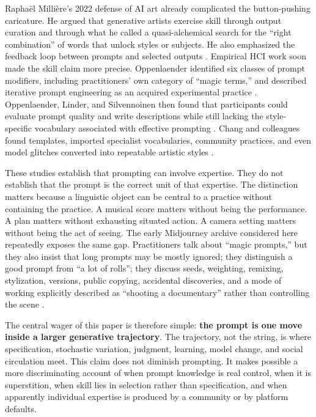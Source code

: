 \documentclass[11pt]{article}
\begin{document}
Raphaël Millière's 2022 defense of AI art already complicated the button-pushing caricature. He argued that generative artists exercise skill through output curation and through what he called a quasi-alchemical search for the ``right combination'' of words that unlock styles or subjects. He also emphasized the feedback loop between prompts and selected outputs \parencite{milliere2022curation}. Empirical HCI work soon made the skill claim more precise. Oppenlaender identified six classes of prompt modifiers, including practitioners' own category of ``magic terms,'' and described iterative prompt engineering as an acquired experimental practice \parencite{oppenlaender2022taxonomy}. Oppenlaender, Linder, and Silvennoinen then found that participants could evaluate prompt quality and write descriptions while still lacking the style-specific vocabulary associated with effective prompting \parencite{oppenlaender2023prompting}. Chang and colleagues found templates, imported specialist vocabularies, community practices, and even model glitches converted into repeatable artistic styles \parencite{chang2023prompt}.

These studies establish that prompting can involve expertise. They do not establish that the prompt is the correct unit of that expertise. The distinction matters because a linguistic object can be central to a practice without containing the practice. A musical score matters without being the performance. A plan matters without exhausting situated action. A camera setting matters without being the act of seeing. The early Midjourney archive considered here repeatedly exposes the same gap. Practitioners talk about ``magic prompts,'' but they also insist that long prompts may be mostly ignored; they distinguish a good prompt from ``a lot of rolls''; they discuss seeds, weighting, remixing, stylization, versions, public copying, accidental discoveries, and a mode of working explicitly described as ``shooting a documentary'' rather than controlling the scene \parencite{hartsoe2022midjourneyarchive}.

The central wager of this paper is therefore simple: \textbf{the prompt is one move inside a larger generative trajectory}. The trajectory, not the string, is where specification, stochastic variation, judgment, learning, model change, and social circulation meet. This claim does not diminish prompting. It makes possible a more discriminating account of when prompt knowledge is real control, when it is superstition, when skill lies in selection rather than specification, and when apparently individual expertise is produced by a community or by platform defaults.
\end{document}
